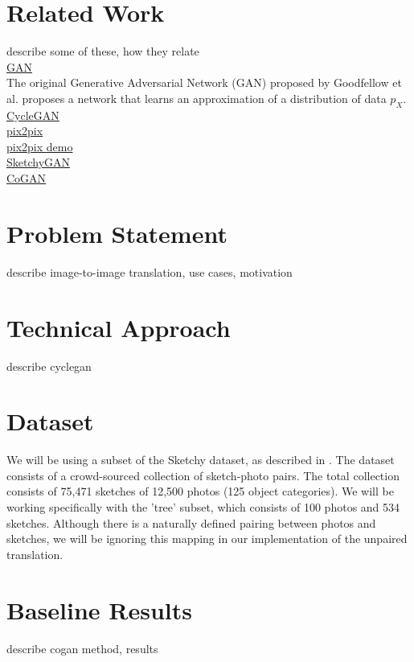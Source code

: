 \documentclass[10pt,twocolumn,letterpaper]{article}
\begin{document}
\section{Related Work}
describe some of these, how they relate \\
\href{https://arxiv.org/abs/1406.2661}{GAN} \\
The original Generative Adversarial Network (GAN) proposed by Goodfellow et al. proposes a network that learns an approximation of a distribution of data $p_{X}$.
\href{https://arxiv.org/pdf/1703.10593}{CycleGAN} \\
\href{https://arxiv.org/abs/1611.07004}{pix2pix} \\
\href{https://affinelayer.com/pixsrv/}{pix2pix demo} \\
\href{https://arxiv.org/abs/1801.02753}{SketchyGAN} \\
\href{https://arxiv.org/abs/1606.07536}{CoGAN} \\

\section{Problem Statement}
describe image-to-image translation, use cases, motivation

\section{Technical Approach}
describe cyclegan

\section{Dataset}
We will be using a subset of the Sketchy dataset, as described in \cite{sangkloy2016sketchy}. The dataset consists of a crowd-sourced collection of sketch-photo pairs. The total collection consists of 75,471 sketches of 12,500 photos (125 object categories). We will be working specifically with the 'tree' subset, which consists of 100 photos and 534 sketches. Although there is a naturally defined pairing between photos and sketches, we will be ignoring this mapping in our implementation of the unpaired translation.

\section{Baseline Results}
describe cogan method, results

{\small


}
\end{document}
